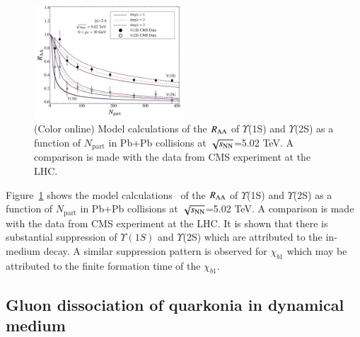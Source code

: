 \begin{figure}[t]
\begin{center}
\includegraphics[width=0.5\textwidth]{Figures/Fig22_YnsRAA_NPart_StricklandModel.pdf}
\end{center}
\vspace{-7mm}
\caption{(Color online) Model calculations \cite{Krouppa:2018lkt} of the $R_{\rm AA}$
  of $\Upsilon$(1S) and $\Upsilon$(2S) as a function of $N_{\text{part}}$
  in Pb+Pb collisions at $\sqrt{s_{\rm NN}}$=5.02 TeV.   
  A comparison is made with the data from CMS experiment \cite{CMS:2018zza} at
  the LHC.}
\label{fig:raasep}
\end{figure}

Figure~\ref{fig:raasep} shows the model calculations~\cite{Krouppa:2018lkt}
of the $R_{\rm AA}$ of $\Upsilon$(1S) and $\Upsilon$(2S) as a function of
$N_{\text{part}}$  in Pb+Pb collisions at $\sqrt{s_{\rm NN}}$=5.02 TeV.   
  A comparison is made with the data from CMS experiment \cite{CMS:2018zza} at
  the LHC. It is shown that there is substantial 
suppression  of $\Upsilon(1S)$ and $\Upsilon$(2S) which are attributed to the in-medium decay.  
A  similar suppression pattern is observed for $\chi_{b1}$ which 
may be attributed to the finite formation time of the $\chi_{b1}$. 
  


\subsection{Gluon dissociation of quarkonia in dynamical medium}

